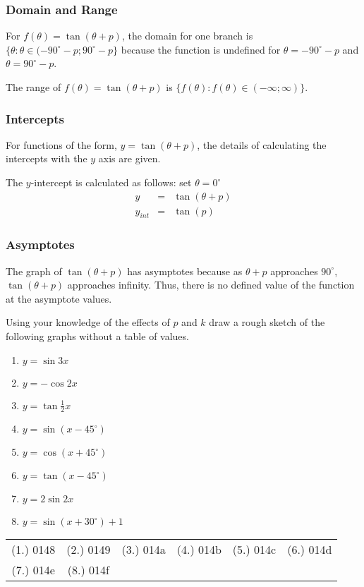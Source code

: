\subsubsection{Domain and Range}
For $f(\theta)=\tan(\theta+p)$, the domain for one branch is $\{\theta:\theta\in(-90^{\circ}-p;90^{\circ}-p\}$ because the function is undefined for $\theta=-90^{\circ}-p$ and $\theta=90^{\circ}-p$.

The range of $f(\theta)=\tan(\theta + p)$ is $\{f(\theta):f(\theta)\in(-\infty;\infty)\}$.

\subsubsection{Intercepts}
For functions of the form, $y=\tan(\theta + p)$, the details of calculating the intercepts with the $y$ axis are given.

The $y$-intercept is calculated as follows: set $\theta = 0^\circ$
\begin{eqnarray*}
y&=&\tan(\theta + p)\\
y_{int}&=&\tan(p)
\end{eqnarray*}

\subsubsection{Asymptotes}
The graph of $\tan (\theta+p)$ has asymptotes because as $\theta +p$ approaches $90^\circ$, $\tan(\theta+p)$ approaches infinity. Thus, there is no defined value of the function at the asymptote values.

{
Using your knowledge of the effects of $p$ and $k$ draw a rough sketch of the following graphs without a table of values.
\begin{enumerate}
\item $y= \sin 3x$
\item $y= -\cos 2x$
\item $y= \tan \tfrac{1}{2}x$
\item $y= \sin(x-45^\circ)$
\item $y= \cos(x+45^\circ)$
\item $y= \tan(x-45^\circ)$
\item $y= 2\sin 2x$
\item $y= \sin(x+30^\circ)+1$
\end{enumerate}


\par \practiceinfo
\par \begin{tabular}[h]{cccccc}
(1.)	0148	&
(2.)	0149	&
(3.)	014a	&
(4.)	014b	&
(5.)	014c	&
(6.)	014d	\\ %
(7.)	014e	&
(8.)	014f	&
\end{tabular}}

